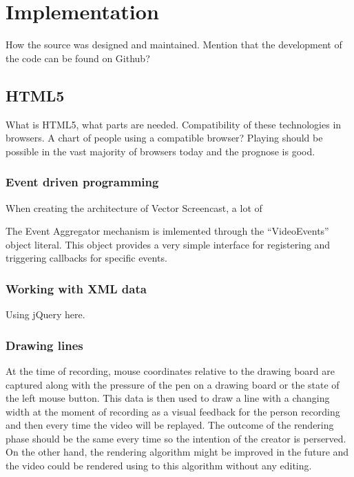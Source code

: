 \chapter{Implementation}
How the source was designed and maintained. Mention that the development of the code can be found on Github?

\section{HTML5}
What is HTML5, what parts are needed. Compatibility of these technologies in browsers. A chart of people using a compatible browser? Playing should be possible in the vast majority of browsers today and the prognose is good.





\subsection{Event driven programming}
When creating the architecture of Vector Screencast, a lot of 

The Event Aggregator mechanism is imlemented through the ``VideoEvents'' object literal. This object provides a very simple interface for registering and triggering callbacks for specific events.














\subsection{Working with XML data}
Using jQuery here.


\subsection{Drawing lines}
At the time of recording, mouse coordinates relative to the drawing board are captured along with the pressure of the pen on a drawing board or the state of the left mouse button. This data is then used to draw a line with a changing width at the moment of recording as a visual feedback for the person recording and then every time the video will be replayed. The outcome of the rendering phase should be the same every time so the intention of the creator is perserved. On the other hand, the rendering algorithm might be improved in the future and the video could be rendered using to this algorithm without any editing.

